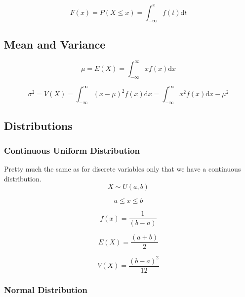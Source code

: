 \documentclass[12pt]{article}
\begin{document}
	\begin{equation*}
		F(x) = P(X\leq x) = \int_{-\infty}^{x}f(t)\mathrm{d} t
	\end{equation*}
	
	\subsection{Mean and Variance}
	
	\begin{equation*}
	\mu = E(X) = \int_{-\infty}^{\infty}xf(x)\mathrm{d} x
	\end{equation*}
	
	\begin{equation*}
	\sigma ^2 = V(X) = \int_{-\infty}^{\infty}(x-\mu)^2f(x)\mathrm{d} x = \int_{-\infty}^{\infty}x^2f(x)\mathrm{d} x-\mu ^2
	\end{equation*}
	
	\newpage
	\subsection{Distributions}
	
	\subsubsection{Continuous Uniform Distribution}
	
	Pretty much the same as for discrete variables only that we have a continuous distribution.
	\begin{equation*}
		X\sim U(a,b)
	\end{equation*}
	
	\begin{equation*}
		a\leq x\leq b
	\end{equation*}
	
	\begin{equation*}
		f(x)=\frac{1}{(b-a)}
	\end{equation*}
	
	\begin{equation*}
		E(X)=\frac{(a+b)}{2}
	\end{equation*}
	
	\begin{equation*}
		V(X)=\frac{(b-a)^2}{12}
	\end{equation*}
	
	\subsubsection{Normal Distribution}
	
\end{document}
